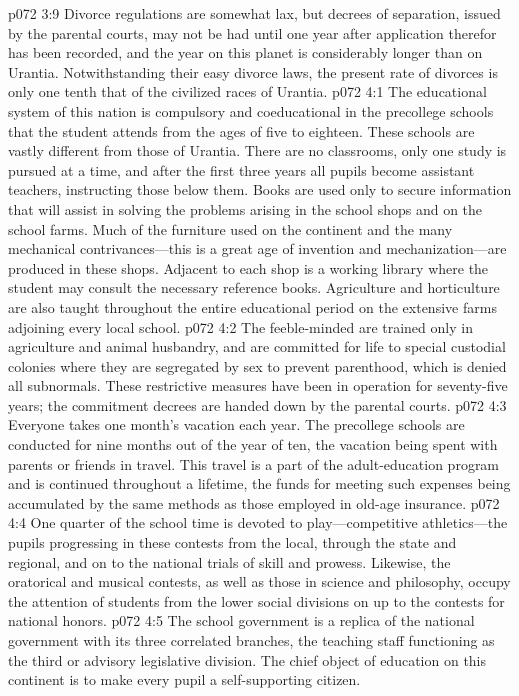 \vs p072 3:9 Divorce regulations are somewhat lax, but decrees of separation, issued by the parental courts, may not be had until one year after application therefor has been recorded, and the year on this planet is considerably longer than on Urantia. Notwithstanding their easy divorce laws, the present rate of divorces is only one tenth that of the civilized races of Urantia.
\vs p072 4:1 The educational system of this nation is compulsory and coeducational in the precollege schools that the student attends from the ages of five to eighteen. These schools are vastly different from those of Urantia. There are no classrooms, only one study is pursued at a time, and after the first three years all pupils become assistant teachers, instructing those below them. Books are used only to secure information that will assist in solving the problems arising in the school shops and on the school farms. Much of the furniture used on the continent and the many mechanical contrivances---this is a great age of invention and mechanization---are produced in these shops. Adjacent to each shop is a working library where the student may consult the necessary reference books. Agriculture and horticulture are also taught throughout the entire educational period on the extensive farms adjoining every local school.\plusone
\pc \vs p072 4:2 The feeble\hyp{}minded are trained only in agriculture and animal husbandry, and are committed for life to special custodial colonies where they are segregated by sex to prevent parenthood, which is denied all subnormals. These restrictive measures have been in operation for seventy\hyp{}five years; the commitment decrees are handed down by the parental courts.
\pc \vs p072 4:3 Everyone takes one month’s vacation each year. The precollege schools are conducted for nine months out of the year of ten, the vacation being spent with parents or friends in travel. This travel is a part of the adult\hyp{}education program and is continued throughout a lifetime, the funds for meeting such expenses being accumulated by the same methods as those employed in old\hyp{}age insurance.
\vs p072 4:4 One quarter of the school time is devoted to play---competitive athletics---the pupils progressing in these contests from the local, through the state and regional, and on to the national trials of skill and prowess. Likewise, the oratorical and musical contests, as well as those in science and philosophy, occupy the attention of students from the lower social divisions on up to the contests for national honors.
\vs p072 4:5 The school government is a replica of the national government with its three correlated branches, the teaching staff functioning as the third or advisory legislative division. The chief object of education on this continent is to make every pupil a self\hyp{}supporting citizen.
